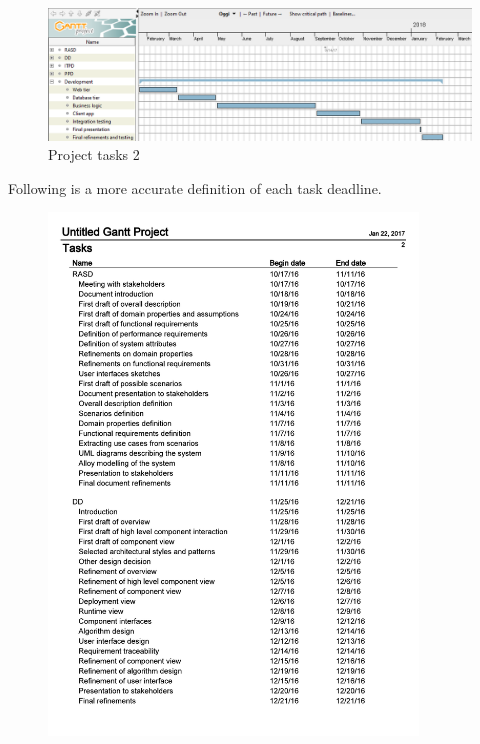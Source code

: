 \begin{figure}[H]
	\centerline{
		\includegraphics[width=500px]{../Datas/images/tasks-schedule-2.png}
	}
	\caption{Project tasks 2}
		\label{fig:tasks-2}
\end{figure}

\newpage
Following is a more accurate definition of each task deadline.

\begin{figure}[H]
	\centerline{
		\includegraphics[width=371px]{../Datas/schedule-dates-1.pdf}
	}
		\label{fig:tasks-2}
\end{figure}

